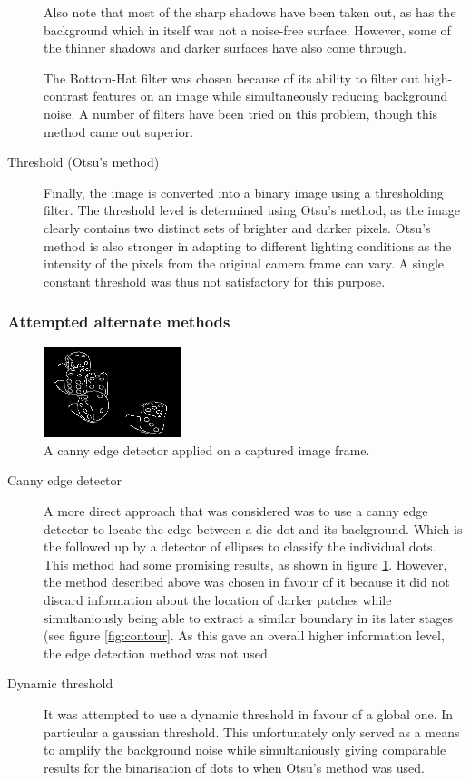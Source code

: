 \begin{description}
Also note that most of the sharp shadows have been taken out, as has the background which in itself was not a noise-free surface. However, some of the thinner shadows and darker surfaces have also come through.

The Bottom-Hat filter was chosen because of its ability to filter out high-contrast features on an image while simultaneously reducing background noise. A number of filters have been tried on this problem, though this method came out superior.

\item[Threshold (Otsu's method)] Finally, the image is converted into a binary image using a thresholding filter. The threshold level is determined using Otsu's method, as the image clearly contains two distinct sets of brighter and darker pixels. Otsu's method is also stronger in adapting to different lighting conditions as the intensity of the pixels from the original camera frame can vary. A single constant threshold was thus not satisfactory for this purpose.

\end{description}

\subsubsection{Attempted alternate methods}

\begin{figure}
	\centering
	\includegraphics[width=40mm]{images/dies/canny_2.png}
	\caption{A canny edge detector applied on a captured image frame.}
	\label{fig:cannyEdge}
\end{figure}

\begin{description}
	\item[Canny edge detector] A more direct approach that was considered was to use a canny edge detector to locate the edge between a die dot and its background. Which is the followed up by a detector of ellipses to classify the individual dots. This method had some promising results, as shown in figure \ref{fig:cannyEdge}. However, the method described above was chosen in favour of it because it did not discard information about the location of darker patches while simultaniously being able to extract a similar boundary in its later stages (see figure \ref{fig:contour}. As this gave an overall higher information level, the edge detection method was not used.
	\item[Dynamic threshold] It was attempted to use a dynamic threshold in favour of a global one. In particular a gaussian threshold. This unfortunately only served as a means to amplify the background noise while simultaniously giving comparable results for the binarisation of dots to when Otsu's method was used.
\end{description}

